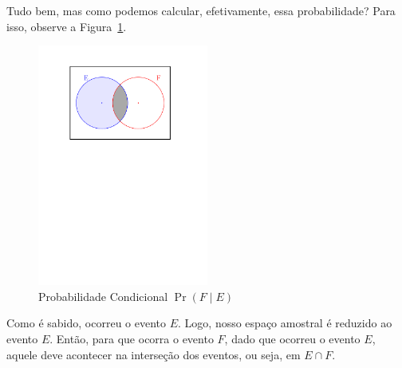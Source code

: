\documentclass[12pt]{article}
\theoremstyle{definition}
\begin{document}
		Tudo bem, mas como podemos calcular, efetivamente, essa probabilidade?
		Para isso, observe a Figura~\ref{fig:diagrama-condicional}.
		
		\begin{figure}[!h]%
		 \centering
		 \includegraphics[width=0.5\textwidth]{diagrama-condicional}%
		 \caption{Probabilidade Condicional $\Pr{(F \mid E)}$}%
		 \label{fig:diagrama-condicional}%
		\end{figure}
		
		Como é sabido, ocorreu o evento $ E $.
		Logo, nosso espaço amostral é reduzido ao evento $E$.
		Então, para que ocorra o evento $ F $, dado que ocorreu o evento $E$, aquele
		deve acontecer na interseção dos	eventos, ou seja, em $ E \cap F $. 
		
\end{document}

